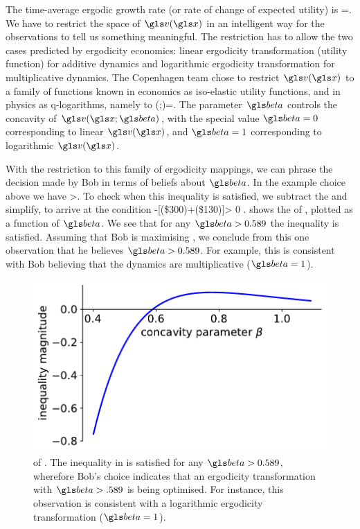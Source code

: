 The time-average ergodic growth rate (or rate of change of expected utility) is
\be
\g=\frac{\ave{\D \gv(\x)}}{\D\t}.
\ee
We have to restrict the space of $\gv(\x)$ in an intelligent way for the observations
to tell us something meaningful. The restriction has to allow the two cases
predicted by ergodicity economics: linear ergodicity transformation (utility function) 
for additive dynamics and logarithmic ergodicity transformation for multiplicative dynamics.
The Copenhagen team chose to restrict $\gv(\x)$ to
a family of functions known in economics as iso-elastic utility functions, and in 
physics as q-logarithms, namely to
\be
\gv(\x;\gbeta)=.
\ee
The parameter $\gbeta$ controls the concavity of $\gv(\x; \gbeta)$, with the special value
$\gbeta=0$ corresponding to linear $\gv(\x)$, and $\gbeta=1$ corresponding to logarithmic $\gv(\x)$.

With the restriction to this family of ergodicity mappings, we can phrase the decision 
made by Bob in terms of beliefs about $\gbeta$. In the example choice above we have
\be
{}>.
\ee
To check when this inequality is satisfied, we subtract the \RHS and simplify, to arrive at
the condition
\be
[\gv(\$220)+\gv(\$190)]-[\gv(\$300)+\gv(\$130)]> 0 .
\ee
{} shows the \LHS of , plotted as a function of $\gbeta$.
We see that for any $\gbeta>0.589$ the inequality is satisfied. Assuming that Bob is 
maximising , we conclude from this one observation
that he believes $\gbeta>0.589$. For example, this is consistent with Bob believing that the 
dynamics are multiplicative ($\gbeta=1$).
\begin{figure}
    \includegraphics[width=.5\textwidth]{./chapter_real/figs/eta_constraint.pdf}
    \caption{\LHS of . The inequality in  is 
    satisfied for any $\gbeta>0.589$, wherefore Bob's choice indicates that an 
    ergodicity transformation with $\gbeta>.589$ is being optimised.
    For instance, this observation is consistent with a logarithmic ergodicity transformation ($\gbeta=1$).}
\end{figure}


